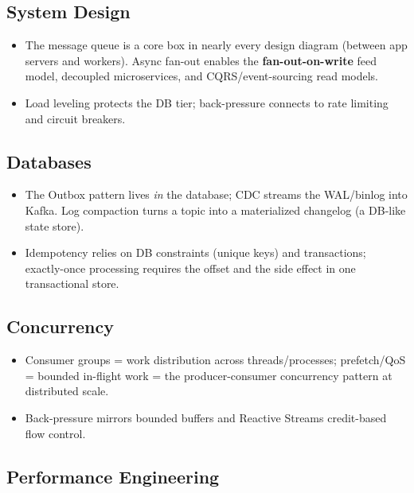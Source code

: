 \documentclass[11pt]{article}
\providecommand{\tightlist}{\setlength{\itemsep}{1pt}\setlength{\parskip}{0pt}}
\begin{document}
\subsection{System Design}\label{system-design}

\begin{itemize}
\tightlist
\item
  The message queue is a core box in nearly every design diagram (between app servers and workers). Async fan-out enables the \textbf{fan-out-on-write} feed model, decoupled microservices, and CQRS/event-sourcing read models.
\item
  Load leveling protects the DB tier; back-pressure connects to rate limiting and circuit breakers.
\end{itemize}

\subsection{Databases}\label{databases}

\begin{itemize}
\tightlist
\item
  The Outbox pattern lives \emph{in} the database; CDC streams the WAL/binlog into Kafka. Log compaction turns a topic into a materialized changelog (a DB-like state store).
\item
  Idempotency relies on DB constraints (unique keys) and transactions; exactly-once processing requires the offset and the side effect in one transactional store.
\end{itemize}

\subsection{Concurrency}\label{concurrency}

\begin{itemize}
\tightlist
\item
  Consumer groups = work distribution across threads/processes; prefetch/QoS = bounded in-flight work = the producer-consumer concurrency pattern at distributed scale.
\item
  Back-pressure mirrors bounded buffers and Reactive Streams credit-based flow control.
\end{itemize}

\subsection{Performance Engineering}\label{performance-engineering}
\end{document}
